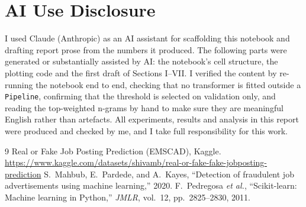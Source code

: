 \documentclass[10pt,conference]{IEEEtran}
\begin{document}
\newpage
\section*{AI Use Disclosure}
I used Claude (Anthropic) as an AI assistant for scaffolding this notebook and drafting
report prose from the numbers it produced. The following parts were generated or
substantially assisted by AI: the notebook's cell structure, the plotting code and the first
draft of Sections I--VII. I verified the content by re-running the notebook end to end,
checking that no transformer is fitted outside a \texttt{Pipeline}, confirming that the
threshold is selected on validation only, and reading the top-weighted n-grams by hand to
make sure they are meaningful English rather than artefacts. All experiments, results and
analysis in this report were produced and checked by me, and I take full responsibility for
this work.

\begin{thebibliography}{9}
 Real or Fake Job Posting Prediction (EMSCAD), Kaggle.
\url{https://www.kaggle.com/datasets/shivamb/real-or-fake-fake-jobposting-prediction}
 S.~Mahbub, E.~Pardede, and A.~Kayes, ``Detection of fraudulent job
advertisements using machine learning,'' 2020.
 F.~Pedregosa \emph{et al.}, ``Scikit-learn: Machine learning in
Python,'' \emph{JMLR}, vol.~12, pp.~2825--2830, 2011.
\end{thebibliography}
\end{document}
